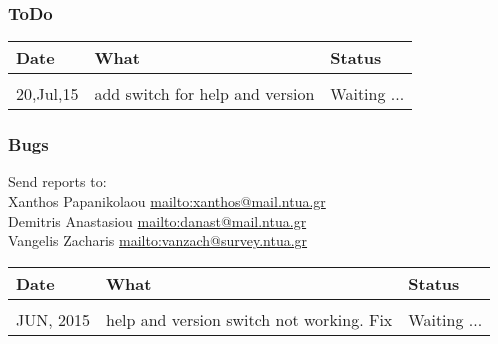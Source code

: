\subsubsection{ToDo}
\begin{tabular}{l l l}
Date & What & Status\\
\hline \\
20,Jul,15  & add switch for help and version & Waiting ...\\
\end{tabular}

\subsubsection{Bugs}
Send reports to:\\
Xanthos Papanikolaou \href{mailto:xanthos@mail.ntua.gr}{mailto:xanthos@mail.ntua.gr}\\
Demitris Anastasiou  \href{mailto:danast@mail.ntua.gr}{mailto:danast@mail.ntua.gr}\\
Vangelis Zacharis  \href{mailto:vanzach@survey.ntua.gr}{mailto:vanzach@survey.ntua.gr}\\
\bigskip

\begin{tabular}{l l l}
Date & What & Status\\
\hline \\
JUN, 2015 & help and version switch not working. Fix & Waiting ...\\
\end{tabular}